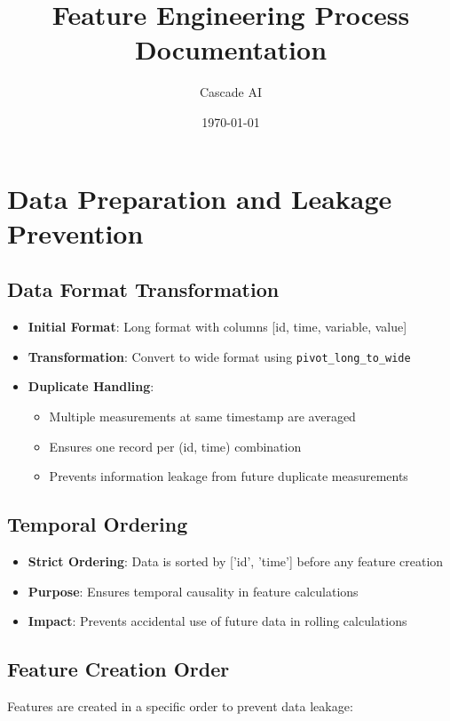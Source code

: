 \documentclass{article}
\title{Feature Engineering Process Documentation}
\author{Cascade AI}
\date{\today}
\begin{document}
\maketitle

\section{Data Preparation and Leakage Prevention}

\subsection{Data Format Transformation}
\begin{itemize}[noitemsep]
\item \textbf{Initial Format}: Long format with columns [id, time, variable, value]
\item \textbf{Transformation}: Convert to wide format using \texttt{pivot\_long\_to\_wide}
\item \textbf{Duplicate Handling}: 
  \begin{itemize}[noitemsep]
  \item Multiple measurements at same timestamp are averaged
  \item Ensures one record per (id, time) combination
  \item Prevents information leakage from future duplicate measurements
  \end{itemize}
\end{itemize}

\subsection{Temporal Ordering}
\begin{itemize}[noitemsep]
\item \textbf{Strict Ordering}: Data is sorted by ['id', 'time'] before any feature creation
\item \textbf{Purpose}: Ensures temporal causality in feature calculations
\item \textbf{Impact}: Prevents accidental use of future data in rolling calculations
\end{itemize}

\subsection{Feature Creation Order}
Features are created in a specific order to prevent data leakage:
\end{document}
